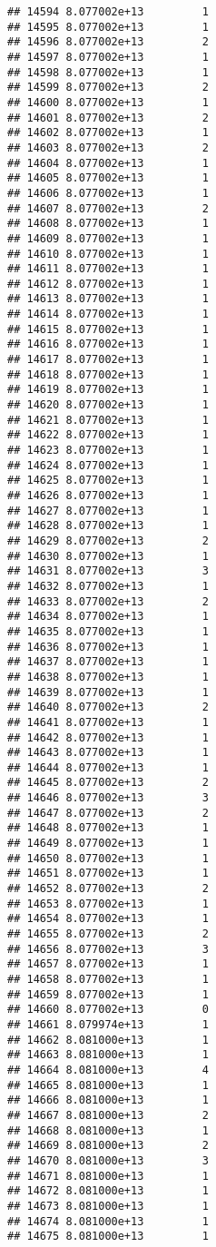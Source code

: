 \documentclass[
]{article}
\begin{document}
\begin{verbatim}
## 14594 8.077002e+13         1
## 14595 8.077002e+13         1
## 14596 8.077002e+13         2
## 14597 8.077002e+13         1
## 14598 8.077002e+13         1
## 14599 8.077002e+13         2
## 14600 8.077002e+13         1
## 14601 8.077002e+13         2
## 14602 8.077002e+13         1
## 14603 8.077002e+13         2
## 14604 8.077002e+13         1
## 14605 8.077002e+13         1
## 14606 8.077002e+13         1
## 14607 8.077002e+13         2
## 14608 8.077002e+13         1
## 14609 8.077002e+13         1
## 14610 8.077002e+13         1
## 14611 8.077002e+13         1
## 14612 8.077002e+13         1
## 14613 8.077002e+13         1
## 14614 8.077002e+13         1
## 14615 8.077002e+13         1
## 14616 8.077002e+13         1
## 14617 8.077002e+13         1
## 14618 8.077002e+13         1
## 14619 8.077002e+13         1
## 14620 8.077002e+13         1
## 14621 8.077002e+13         1
## 14622 8.077002e+13         1
## 14623 8.077002e+13         1
## 14624 8.077002e+13         1
## 14625 8.077002e+13         1
## 14626 8.077002e+13         1
## 14627 8.077002e+13         1
## 14628 8.077002e+13         1
## 14629 8.077002e+13         2
## 14630 8.077002e+13         1
## 14631 8.077002e+13         3
## 14632 8.077002e+13         1
## 14633 8.077002e+13         2
## 14634 8.077002e+13         1
## 14635 8.077002e+13         1
## 14636 8.077002e+13         1
## 14637 8.077002e+13         1
## 14638 8.077002e+13         1
## 14639 8.077002e+13         1
## 14640 8.077002e+13         2
## 14641 8.077002e+13         1
## 14642 8.077002e+13         1
## 14643 8.077002e+13         1
## 14644 8.077002e+13         1
## 14645 8.077002e+13         2
## 14646 8.077002e+13         3
## 14647 8.077002e+13         2
## 14648 8.077002e+13         1
## 14649 8.077002e+13         1
## 14650 8.077002e+13         1
## 14651 8.077002e+13         1
## 14652 8.077002e+13         2
## 14653 8.077002e+13         1
## 14654 8.077002e+13         1
## 14655 8.077002e+13         2
## 14656 8.077002e+13         3
## 14657 8.077002e+13         1
## 14658 8.077002e+13         1
## 14659 8.077002e+13         1
## 14660 8.077002e+13         0
## 14661 8.079974e+13         1
## 14662 8.081000e+13         1
## 14663 8.081000e+13         1
## 14664 8.081000e+13         4
## 14665 8.081000e+13         1
## 14666 8.081000e+13         1
## 14667 8.081000e+13         2
## 14668 8.081000e+13         1
## 14669 8.081000e+13         2
## 14670 8.081000e+13         3
## 14671 8.081000e+13         1
## 14672 8.081000e+13         1
## 14673 8.081000e+13         1
## 14674 8.081000e+13         1
## 14675 8.081000e+13         1

\end{verbatim}
\end{document}
